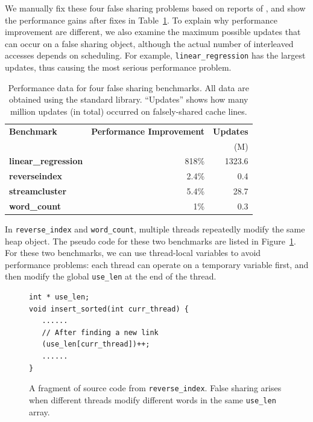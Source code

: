 We manually fix these four false sharing problems based on reports of \SheriffDetect{}, and show the performance gains after fixes in Table~\ref{table:perfafterfix}. To explain why performance improvement are different, we also examine the maximum possible updates that can occur on a false sharing object, although the actual number of interleaved accesses depends on scheduling. For example, \texttt{linear\_regression} has the largest updates, thus causing the most serious performance problem. 

\begin{table}
\centering
\begin{tabular}{l|r|r}
\hline
{\bf \small Benchmark} & {\bf \small Performance Improvement} & {\bf \small Updates}\\
 & & (M)\\
\hline
\small \textbf{linear\_regression} & 818\% & 1323.6\\
\small \textbf{reverseindex} &  2.4\% & 0.4\\
\small \textbf{streamcluster} & 5.4\% & 28.7\\
\small \textbf{word\_count} &  1\% & 0.3\\
\hline
\end{tabular}
\caption{Performance data for four false sharing benchmarks. All data are obtained using the standard \pthreads{} library. ``Updates'' shows how many million updates (in total) occurred on falsely-shared cache lines.
\label{table:perfafterfix}}
\end{table}


In \texttt{reverse\_index} and \texttt{word\_count}, multiple threads repeatedly modify the same heap object. The pseudo code for these two benchmarks are listed in Figure~\ref{fig:reverseindex}. For these two benchmarks, we can use thread-local variables to avoid performance problems: each thread can operate on a temporary variable first, and then modify the global \texttt{use\_len} at the end of the thread.

\begin{figure}[!t]
\begin{lstlisting}[style=tt]
int * use_len;
void insert_sorted(int curr_thread) {
   ......	
   // After finding a new link
   (use_len[curr_thread])++;
   ......	
}
\end{lstlisting}
\caption{A fragment of source code from \texttt{reverse\_index}. False sharing arises when different threads 
modify different words in the same \texttt{use\_len} array. 
\label{fig:reverseindex}}
\end{figure}

